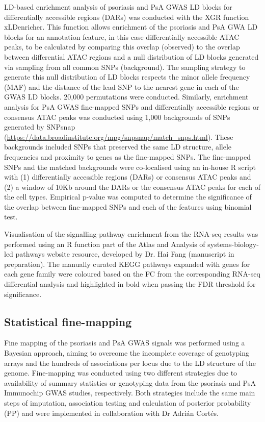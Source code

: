 LD-based enrichment analysis of psoriasis and PsA GWAS LD blocks for differentially accessible regions (DARs) was conducted with the XGR function xLDenricher. This function allows enrichment of the psoriasis and PsA GWA LD blocks for an annotation feature, in this case differentially accessible ATAC peaks, to be calculated by comparing this overlap (observed) to the overlap between differential ATAC regions and a null distribution of LD blocks generated via sampling from all common SNPs (background). The sampling strategy to generate this null distribution of LD blocks respects the minor allele frequency (MAF) and the distance of the lead SNP to the nearest gene in each of the GWAS LD blocks. 20,000 permutations were conducted. Similarly, enrichment analysis for PsA GWAS fine-mapped SNPs and differentially accessible regions or consensus ATAC peaks was conducted using 1,000 backgrounds of SNPs generated by SNPsnap (\url{https://data.broadinstitute.org/mpg/snpsnap/match_snps.html}). These backgrounds included SNPs that preserved the same LD structure, allele frequencies and proximity to genes as the fine-mapped SNPs. The fine-mapped SNPs and the matched backgrounds were co-localised using an in-house R script with (1) differentially accessible regions (DARs) or consensus ATAC peaks and (2) a window of 10Kb around the DARs or the consensus ATAC peaks for each of the cell types. Empirical p-value was computed to determine the significance of the overlap between fine-mapped SNPs and each of the features using binomial test.

Visualisation of the signalling-pathway enrichment from the RNA-seq results was performed using an R function part of the Atlas and Analysis of systems-biology-led pathways website resource, developed by Dr. Hai Fang (manuscript in preparation). The manually curated KEGG pathways expanded with genes for each gene family were coloured based on the FC from the corresponding RNA-seq differential analysis and highlighted in bold when passing the FDR threshold for significance.


\subsection{Statistical fine-mapping}
Fine mapping of the psoriasis and PsA GWAS signals was performed using a Bayesian approach, aiming to overcome the incomplete coverage of genotyping arrays and the hundreds of associations per locus due to the LD structure of the genome. Fine-mapping was conducted using two different strategies due to availability of summary statistics or genotyping data from the psoriasis and PsA Immunochip GWAS studies, respectively. Both strategies include the same main steps of imputation, association testing and calculation of posterior probability (PP) and were implemented in collaboration with Dr Adri\'{a}n Cort\'{e}s.


